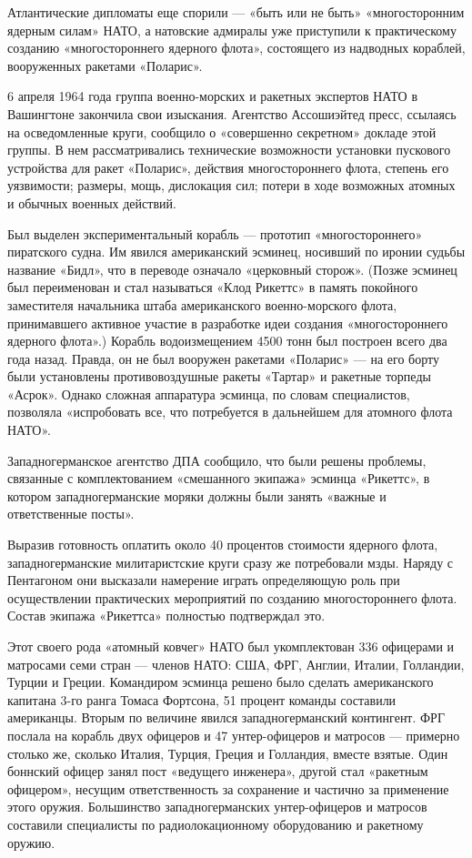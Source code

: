 \documentclass[12pt, a4paper, openany]{book}
\begin{document}
	Атлантические дипломаты еще спорили — «быть или не быть» «многосторонним ядерным силам» НАТО, а натовские адмиралы уже приступили к практическому созданию «многостороннего ядерного флота», состоящего из надводных кораблей, вооруженных ракетами «Поларис».
	
	6 апреля 1964 года группа военно-морских и ракетных экспертов НАТО в Вашингтоне закончила свои изыскания. Агентство Ассошиэйтед пресс, ссылаясь на осведомленные круги, сообщило о «совершенно секретном» докладе этой группы. В нем рассматривались технические возможности установки пускового устройства для ракет «Поларис», действия многостороннего флота, степень его уязвимости; размеры, мощь, дислокация сил; потери в ходе возможных атомных и обычных военных действий.
	
	Был выделен экспериментальный корабль — прототип «многостороннего» пиратского судна. Им явился американский эсминец, носивший по иронии судьбы название «Бидл», что в переводе означало «церковный сторож». (Позже эсминец был переименован и стал называться «Клод Рикеттс» в память покойного заместителя начальника штаба американского военно-морского флота, принимавшего активное участие в разработке идеи создания «многостороннего ядерного флота».) Корабль водоизмещением 4500 тонн был построен всего два года назад. Правда, он не был вооружен ракетами «Поларис» — на его борту были установлены противовоздушные ракеты «Тартар» и ракетные торпеды «Асрок». Однако сложная аппаратура эсминца, по словам специалистов, позволяла «испробовать все, что потребуется в дальнейшем для атомного флота НАТО».
	
	
	Западногерманское агентство ДПА сообщило, что были решены проблемы, связанные с комплектованием «смешанного экипажа» эсминца «Рикеттс», в котором западногерманские моряки должны были занять «важные и ответственные посты».
	
	Выразив готовность оплатить около 40 процентов стоимости ядерного флота, западногерманские милитаристские круги сразу же потребовали мзды. Наряду с Пентагоном они высказали намерение играть определяющую роль при осуществлении практических мероприятий по созданию многостороннего флота. Состав экипажа «Рикеттса» полностью подтверждал это.
	
	Этот своего рода «атомный ковчег» НАТО был укомплектован 336 офицерами и матросами семи стран — членов НАТО: США, ФРГ, Англии, Италии, Голландии, Турции и Греции. Командиром эсминца решено было сделать американского капитана 3-го ранга Томаса Фортсона, 51 процент команды составили американцы. Вторым по величине явился западногерманский контингент. ФРГ послала на корабль двух офицеров и 47 унтер-офицеров и матросов — примерно столько же, сколько Италия, Турция, Греция и Голландия, вместе взятые. Один боннский офицер занял пост «ведущего инженера», другой стал «ракетным офицером», несущим ответственность за сохранение и частично за применение этого оружия. Большинство западногерманских унтер-офицеров и матросов составили специалисты по радиолокационному оборудованию и ракетному оружию.
	
\end{document}
